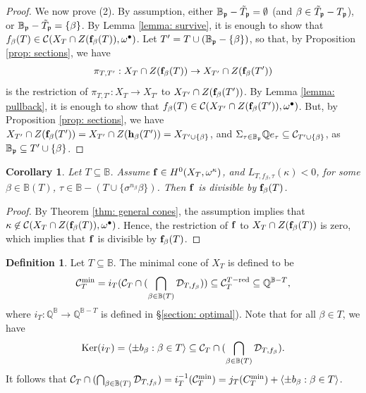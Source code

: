 \documentclass[11pt,pdflatex]{amsart}
\theoremstyle{plain}
\newtheorem{corollary}[theorem]{Corollary}
\theoremstyle{definition}
\newcommand{\QQ}{\mathbf{Q}}
\theoremstyle{plain}
\theoremstyle{definition}
\newtheorem{dfn}[theorem]{Definition}
\theoremstyle{remark}
\numberwithin{equation}{section}
\numberwithin{figure}{section} \numberwithin{table}{subsection}
\newcommand{\gerp}{{\frak{p}}}
\newcommand{\calC}{{\mathcal{C}}}
\newcommand{\calD}{{\mathcal{D}}}
\def\BB{\mathbb{B}}
\def\QQ{\mathbb{Q}}
\begin{document}
\begin{proof}
We now prove (2). By assumption, either $\BB_\gerp-\tilde{T}_\gerp=\emptyset$ (and $\beta \in \tilde{T}_\gerp-T_\gerp$), or $\BB_\gerp-\tilde{T}_\gerp=\{\beta\}$. By Lemma \ref{lemma: survive}, it is enough to show that $f_\beta(T) \in \calC(X_T \cap Z({\bf f}_\beta(T)),\omega^\bullet)$.   Let $T'=T \cup (\BB_\gerp-\{\beta\})$, so that, by Proposition \ref{prop: sections}, we have $$\pi_{T,T'}: X_T \cap Z({\bf f}_\beta(T)) \rightarrow X_{T'} \cap Z({\bf f}_\beta(T'))$$
is the restriction of $\pi_{T,T'}:X_T \rightarrow X_{T'}$ to $X_{T'} \cap Z({\bf f}_\beta(T'))$. By Lemma \ref{lemma: pullback}, it is enough to show that $f_\beta(T) \in \calC(X_{T'}\cap Z({\bf f}_\beta(T')),\omega^\bullet)$. But, by Proposition \ref{prop: sections}, we have   $X_{T'}\cap Z({\bf f}_\beta(T'))=X_{T'}\cap Z({\bf h}_\beta(T'))=X_{T'\cup\{\beta\}}$, and $\Sigma_{\tau \in \BB_\gerp} \QQ e_\tau \subseteq \calC_{T'\cup\{\beta\}}$, as $\BB_\gerp \subseteq T'\cup\{\beta\}$.
 \end{proof}
 
 \begin{corollary}\label{cor: divisibility}Let $T \subseteq \BB$. Assume ${\bf f}\in H^0(X_T,\omega^\kappa)$, and  $L_{T,f_\beta,\tau}(\kappa)<0$, for some $\beta \in \BB(T)$, $\tau \in \BB-(T \cup\{\sigma^{n_\beta}\beta\})$. Then ${\bf f}$ is divisible by ${\bf f}_\beta(T)$.
\end{corollary}

\begin{proof} By Theorem \ref{thm: general cones}, the assumption implies that $\kappa \not \in \calC(X_T \cap Z({\bf f}_\beta(T)), \omega^\bullet)$. Hence, the restriction of $\bf f$ to $X_T \cap Z({\bf f}_\beta(T))$ is zero, which implies that ${\bf f}$ is divisible by ${\bf f}_\beta(T)$.
\end{proof}

\begin{dfn} Let $T \subseteq \BB$. The minimal cone of $X_T$ is defined to be 
$$\calC^{\rm min}_T=  i_T( \calC_T \cap (\bigcap_{\beta \in \BB(T)}  \calD_{T,f_\beta}))\subseteq \calC_T^{T-{\rm red}} \subseteq \QQ^{\BB-T},$$
where $i_T:\QQ^{\BB} \rightarrow \QQ^{\BB-T}$ is defined in \S \ref{section: optimal}). Note that for all $\beta \in T$, we have $${\rm Ker} (i_T)=\langle \pm b_\beta: \beta \in T \rangle \subseteq  \calC_T \cap (\bigcap_{\beta \in \BB(T)}  \calD_{T,f_\beta}).$$  
It follows that $\calC_T \cap (\bigcap_{\beta \in \BB(T)}  \calD_{T,f_\beta})= i_T^{-1}(\calC^{\rm min}_T)=j_T(C_T^{\rm min}) + \langle \pm b_\beta: \beta \in T \rangle$.

\end{dfn}
\end{document}
